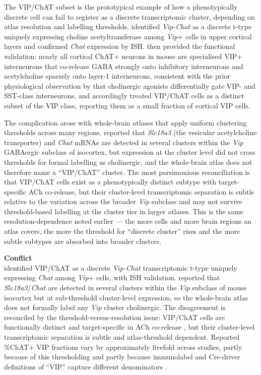 \documentclass[11pt]{article}
\begin{document}
The VIP/ChAT subset is the prototypical example of how a phenotypically discrete cell can fail to register as a discrete transcriptomic cluster, depending on atlas resolution and labelling thresholds. \citet{Tasic2016} identified \textit{Vip-Chat} as a discrete t-type uniquely expressing choline acetyltransferase among \textit{Vip}+ cells in upper cortical layers and confirmed \textit{Chat} expression by ISH. \citet{Granger2020} then provided the functional validation: nearly all cortical ChAT+ neurons in mouse are specialised VIP+ interneurons that co-release GABA strongly onto inhibitory interneurons and acetylcholine sparsely onto layer-1 interneurons, consistent with the prior physiological observation by \citet{Kawaguchi1997b} that cholinergic agonists differentially gate VIP- and SST-class interneurons. \citet{Tremblay2016} and \citet{Paul2017} accordingly treated VIP/ChAT cells as a distinct subset of the VIP class, reporting them as a small fraction of cortical VIP cells.

The complication arose with whole-brain atlases that apply uniform clustering thresholds across many regions. \citet{Yao2023} reported that \textit{Slc18a3} (the vesicular acetylcholine transporter) and \textit{Chat} mRNAs are detected in several clusters within the \textit{Vip} GABAergic subclass of isocortex, but expression at the cluster level did not cross thresholds for formal labelling as cholinergic, and the whole-brain atlas does not therefore name a ``VIP/ChAT'' cluster. The most parsimonious reconciliation is that VIP/ChAT cells exist as a phenotypically distinct subtype with target-specific ACh co-release, but their cluster-level transcriptomic separation is subtle relative to the variation across the broader \textit{Vip} subclass and may not survive threshold-based labelling at the cluster tier in larger atlases. This is the same resolution-dependence noted earlier --- the more cells and more brain regions an atlas covers, the more the threshold for ``discrete cluster'' rises and the more subtle subtypes are absorbed into broader clusters.

\begin{framed}
\textbf{Conflict}\\
\citet{Tasic2016} identified VIP/ChAT as a discrete \textit{Vip-Chat} transcriptomic t-type uniquely expressing \textit{Chat} among \textit{Vip}+ cells, with ISH validation. \citet{Yao2023} reported that \textit{Slc18a3}/\textit{Chat} are detected in several clusters within the \textit{Vip} subclass of mouse isocortex but at sub-threshold cluster-level expression, so the whole-brain atlas does not formally label any \textit{Vip} cluster cholinergic. The disagreement is reconciled by the threshold-versus-resolution issue: VIP/ChAT cells are functionally distinct and target-specific in ACh co-release \citep{Granger2020, Kawaguchi1997b}, but their cluster-level transcriptomic separation is subtle and atlas-threshold dependent. Reported \%ChAT+ VIP fractions vary by approximately fivefold across studies, partly because of this thresholding and partly because immunolabel and Cre-driver definitions of ``VIP'' capture different denominators \citep{Tasic2016, Granger2020, Tremblay2016}.
\end{framed}
\end{document}
